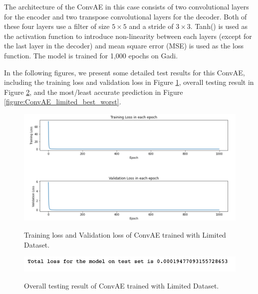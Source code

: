 The architecture of the ConvAE in this case consists of two convolutional layers for the encoder and two transpose convolutional layers for the decoder. Both of these four layers use a filter of size $5 \times 5$ and a stride of $3 \times 3$. Tanh() is used as the activation function to introduce non-linearity between each layers (except for the last layer in the decoder) and mean square error (MSE) is used as the loss function. The model is trained for 1,000 epochs on Gadi.

In the following figures, we present some detailed test results for this ConvAE, including the training loss and validation loss in Figure \ref{figure:ConvAE_limited_losses}, overall testing result in Figure \ref{figure:ConvAE_limited_testing}, and the most/least accurate prediction in 
Figure \ref{figure:ConvAE_limited_best_worst}.

\begin{figure}[H]
    \caption{Training loss and Validation loss of ConvAE trained with Limited Dataset.}
    \includegraphics[scale=0.6]{figures/mantle_convection_images/limited_dataset/ConvAE_trainingData.png}
    \label{figure:ConvAE_limited_losses}
\end{figure}

\begin{figure}[H]
    \caption{Overall testing result of ConvAE trained with Limited Dataset.}
    \includegraphics[scale=0.8]{figures/mantle_convection_images/limited_dataset/ConvAE_OverallTesting.png}
    \label{figure:ConvAE_limited_testing}
\end{figure}

